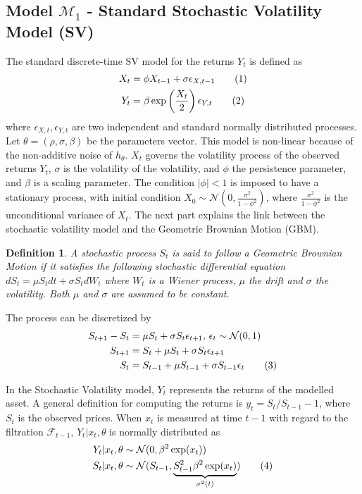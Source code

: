 \documentclass[11pt,a4,twosided,singlespacing,titlepagenumber=on]{scrreprt}
\numberwithin{equation}{chapter} %
\newtheorem{definition}[theorem]{Definition}%
\theoremstyle{remark}
\newcommand\numberthis{\addtocounter{equation}{1}\tag{\theequation}}
\begin{document}
\subsection{Model $\mathcal{M}_1$ - Standard Stochastic Volatility Model (SV)}
The standard discrete-time SV model for the returns $Y_t$ is defined as
\begin{align*}
  X_t &=  \phi X_{t-1} + \sigma \epsilon_{X,t-1} \numberthis \label{std_SV_process_X} \\
  Y_t &=  \beta \exp \left( \frac{X_t}{2} \right) \epsilon_{Y,t} \numberthis
\end{align*}
where $\epsilon_{X,t}, \epsilon_{Y,t}$ are two independent and standard normally distributed processes. Let $\theta = (\rho, \sigma, \beta)$ be the parameters vector. This model is non-linear because of the non-additive noise of $h_\theta$. $X_t$ governs the volatility process of the observed returns $Y_t$, $\sigma$ is the volatility of the volatility, and $\phi$ the persistence parameter, and $\beta$ is a scaling parameter. The condition $|\phi| < 1$  is imposed to have a stationary process, with initial condition $X_0 \sim \mathcal{N} \left(0, \frac{\sigma^2}{1-\phi^2} \right)$, where $\frac{\sigma^2}{1-\phi^2}$ is the unconditional variance of $X_t$. The next part explains the link between the stochastic volatility model and the Geometric Brownian Motion (GBM).

\begin{definition}
\textit{
A stochastic process $S_t$ is said to follow a Geometric Brownian Motion if it satisfies the following stochastic differential equation
$dS_t = \mu S_t dt + \sigma S_t dW_t$
where $W_t$ is a Wiener process, $\mu$ the drift and $\sigma$ the volatility. Both $\mu$ and $\sigma$ are assumed to be constant.}
\end{definition}

The process can be discretized by
\begin{align*}
S_{t+1}-S_t &= \mu S_t + \sigma S_t \epsilon_{t+1} \text{, } \epsilon_{t} \sim \mathcal{N}(0,1) \\
S_{t+1} 	&= S_t + \mu S_t + \sigma S_t \epsilon_{t+1} \\
S_t 	&= S_{t-1} + \mu S_{t-1} + \sigma S_{t-1} \epsilon_t \numberthis
\end{align*}

In the Stochastic Volatility model, $Y_t$ represents the returns of the modelled asset. A general definition for computing the returns is $y_t = S_t / S_{t-1} - 1$, where $S_t$ is the observed prices. When $x_t$ is measured at time $t-1$ with regard to the filtration $\mathcal{F}_{t-1}$, $Y_t | x_t, \theta$ is normally distributed as
\begin{align*}
Y_t | x_t, \theta 					&\sim \mathcal{N}(0, \beta^2 \exp(x_t)) \\
S_t | x_t, \theta 					&\sim \mathcal{N}(S_{t-1}, \underbrace{S_{t-1}^2 \beta^2 \exp(x_t)}_{\sigma^2(t)}) \numberthis \label{cond_dist_sv_model}
\end{align*}
\end{document}
